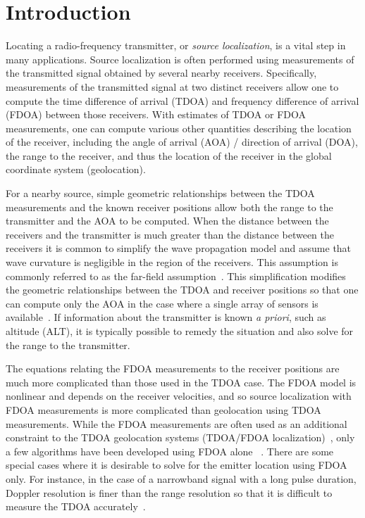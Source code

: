 \section{Introduction}
\label{s:intro}
Locating a radio-frequency transmitter, or \emph{source localization}, is a vital step in many applications. Source localization is often performed using measurements of the transmitted signal obtained by several nearby receivers. Specifically, measurements of the transmitted signal at two distinct receivers allow one to compute the time difference of arrival (TDOA) and frequency difference of arrival (FDOA) between those receivers. With estimates of TDOA or FDOA measurements, one can compute various other quantities describing the location of the receiver, including the angle of arrival (AOA) / direction of arrival (DOA), the range to the receiver, and thus the location of the receiver in the global coordinate system (geolocation).

For a nearby source, simple geometric relationships between the TDOA measurements and the known receiver positions allow both the range to the transmitter and the AOA to be computed. When the distance between the receivers and the transmitter is much greater than the distance between the receivers it is common to simplify the wave propagation model and assume that wave curvature is negligible in the region of the receivers. This assumption is commonly referred to as the far-field assumption~\cite{Cheney2009}. This simplification modifies the geometric relationships between the TDOA and receiver positions so that one can compute only the AOA in the case where a single array of sensors is available~\cite{Benesty2008}. If information about the transmitter is known {\em a priori}, such as altitude (ALT), it is typically possible to remedy the situation and also solve for the range to the transmitter.

The equations relating the FDOA measurements to the receiver positions are much more complicated than those used in the TDOA case. The FDOA model is nonlinear and depends on the receiver velocities, and so source localization with FDOA measurements is more complicated than geolocation using TDOA measurements. While the FDOA measurements are often used as an additional constraint to the TDOA geolocation systems (TDOA/FDOA localization)~\cite{Ho1997}, only a few algorithms have been developed using FDOA alone ~\cite{Cameron,Jinzhou2012}. There are some special cases where it is desirable to solve for the emitter location using FDOA only. For instance, in the case of a narrowband signal with a long pulse duration, Doppler resolution is finer than the range resolution so that it is difficult to measure the TDOA accurately~\cite{Cheney2009,Mason2005,Jinzhou2012}.

